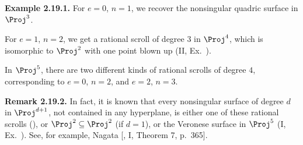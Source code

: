 {\medskip
\noindent\hypertarget{result-V-2.19.1}{}\textbf{Example 2.19.1.} For $e=0$, $n=1$, we recover the nonsingular quadric surface in $\Proj^3$.

For $e=1$, $n=2$, we get a rational scroll of degree $3$ in $\Proj^4$, which is isomorphic to $\Proj^2$ with one point blown up (II, Ex.~).

In $\Proj^5$, there are two different kinds of rational scrolls of degree $4$, corresponding to $e=0$, $n=2$, and $e=2$, $n=3$.

\medskip
\noindent\hypertarget{result-V-2.19.2}{}\textbf{Remark 2.19.2.} In fact, it is known that every nonsingular surface of degree $d$ in $\Proj^{d+1}$, not contained in any hyperplane, is either one of these rational scrolls (), or $\Proj^2\subseteq\Proj^2$ (if $d=1$), or the Veronese surface in $\Proj^5$ (I, Ex.~). See, for example, Nagata [, I, Theorem 7, p.~365].
}
